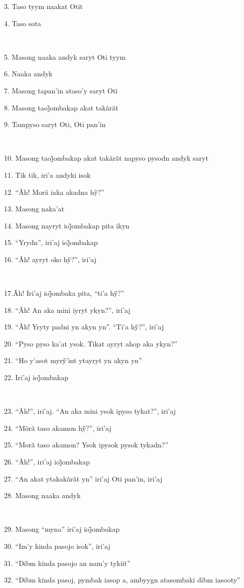 3. Taso tyym naakat Otit

4. Taso sota

~

5. Masong naaka andyk saryt Oti tyym

6. Naaka andyk

7. Masong tapan'in ataso'y saryt Oti

8. Masong taoj̃ombakap akat takãrãt

9. Tampyso saryt Oti, Oti pan'in

~

10. Masong taoj̃ombakap akat takãrãt napyso pysodn andyk saryt

11. Tik tik, iri'a andyki isok

12. ``Ãh! Morã iaka akadna hỹ?''

13. Masong naka'at

14. Masong nayryt ioj̃ombakap pita ikyn

15. ``Yrydn'', iri’aj ioj̃ombakap

16. ``Ãh! ayryt oko hỹ?'', iri’aj

~

17.Ãh! Iri’aj ioj̃ombaka pita, ``ti’a hỹ?''

18. ``Ãh! An aka mini iyryt ykyn?'', iri'aj

19. ``Ãh! Yryty padni yn akyn yn''. ``Ti’a hỹ?'', iri’aj

20. ``Pyso pyso ka'at ysok. Tikat ayryt ahop aka ykyn?''

21. ``Ho y’asot myrỹ’int ytayryt yn akyn yn''

22. Iri’aj ioj̃ombakap

~

23. ``Ãh!'', iri'aj. ``An aka mini ysok ipyso tykat?'', iri'aj

24. ``Mõrã taso akamon hỹ?'', iri’aj

25. ``Morã taso akamon? Ysok ipysok pysok tykadn?''

26. ``Ãh!'', iri’aj ioj̃ombakap

27. ``An akat ytakakãrãt yn'' iri'aj Oti pan'in, iri'aj

28. Masong naaka andyk

~

29. Masong ``myna'' iri’aj ioj̃ombakap

30. ``Im'y kinda pasojo isok'', iri'aj

31. ``Dibm kinda pasojo an nam'y tykiit''

32. ``Dibm kinda pasoj, pymbak iasop a, ambyygn atasombaki dibm iasooty''

